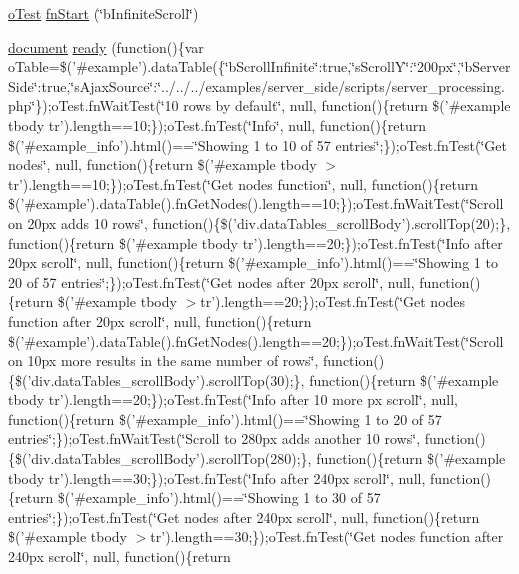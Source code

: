 \begin{DoxyCompactItemize}
\item 
\hyperlink{unit__test_8js_a3b2d259e2df3b6860d9047a92d09d0d6}{o\+Test} \hyperlink{4__server-side_2b_infinite_scroll_8js_afbd556b10fcc8cc11d494a0f87039138}{fn\+Start} (\char`\"{}b\+Infinite\+Scroll\char`\"{})
\item 
\hyperlink{outside_events_8js_aa14f8e0338cced6720590fd2ea13bd4b}{document} \hyperlink{4__server-side_2b_infinite_scroll_8js_a09af2ae78032603f280a6a36406674c7}{ready} (function()\{var o\+Table=\$('\#example').data\+Table(\{\char`\"{}b\+Scroll\+Infinite\char`\"{}\+:true,\char`\"{}s\+Scroll\+Y\char`\"{}\+:\char`\"{}200px\char`\"{},\char`\"{}b\+Server\+Side\char`\"{}\+:true,\char`\"{}s\+Ajax\+Source\char`\"{}\+:\char`\"{}../../../examples/server\+\_\+side/scripts/server\+\_\+processing.\+php\char`\"{}\});o\+Test.\+fn\+Wait\+Test(\char`\"{}10 rows by default\char`\"{}, null, function()\{return \$('\#example tbody tr').\+length==10;\});o\+Test.\+fn\+Test(\char`\"{}\+Info\char`\"{}, null, function()\{return \$('\#example\+\_\+info').\+html()==\char`\"{}\+Showing 1 to 10 of 57 entries\char`\"{};\});o\+Test.\+fn\+Test(\char`\"{}\+Get nodes\char`\"{}, null, function()\{return \$('\#example tbody $>$tr').\+length==10;\});o\+Test.\+fn\+Test(\char`\"{}\+Get nodes function\char`\"{}, null, function()\{return \$('\#example').\+data\+Table().\+fn\+Get\+Nodes().\+length==10;\});o\+Test.\+fn\+Wait\+Test(\char`\"{}\+Scroll on 20px adds 10 rows\char`\"{}, function()\{\$('div.\+data\+Tables\+\_\+scroll\+Body').\+scroll\+Top(20);\}, function()\{return \$('\#example tbody tr').\+length==20;\});o\+Test.\+fn\+Test(\char`\"{}\+Info after 20px scroll\char`\"{}, null, function()\{return \$('\#example\+\_\+info').\+html()==\char`\"{}\+Showing 1 to 20 of 57 entries\char`\"{};\});o\+Test.\+fn\+Test(\char`\"{}\+Get nodes after 20px scroll\char`\"{}, null, function()\{return \$('\#example tbody $>$tr').\+length==20;\});o\+Test.\+fn\+Test(\char`\"{}\+Get nodes function after 20px scroll\char`\"{}, null, function()\{return \$('\#example').\+data\+Table().\+fn\+Get\+Nodes().\+length==20;\});o\+Test.\+fn\+Wait\+Test(\char`\"{}\+Scroll on 10px more results in the same number of rows\char`\"{}, function()\{\$('div.\+data\+Tables\+\_\+scroll\+Body').\+scroll\+Top(30);\}, function()\{return \$('\#example tbody tr').\+length==20;\});o\+Test.\+fn\+Test(\char`\"{}\+Info after 10 more px scroll\char`\"{}, null, function()\{return \$('\#example\+\_\+info').\+html()==\char`\"{}\+Showing 1 to 20 of 57 entries\char`\"{};\});o\+Test.\+fn\+Wait\+Test(\char`\"{}\+Scroll to 280px adds another 10 rows\char`\"{}, function()\{\$('div.\+data\+Tables\+\_\+scroll\+Body').\+scroll\+Top(280);\}, function()\{return \$('\#example tbody tr').\+length==30;\});o\+Test.\+fn\+Test(\char`\"{}\+Info after 240px scroll\char`\"{}, null, function()\{return \$('\#example\+\_\+info').\+html()==\char`\"{}\+Showing 1 to 30 of 57 entries\char`\"{};\});o\+Test.\+fn\+Test(\char`\"{}\+Get nodes after 240px scroll\char`\"{}, null, function()\{return \$('\#example tbody $>$tr').\+length==30;\});o\+Test.\+fn\+Test(\char`\"{}\+Get nodes function after 240px scroll\char`\"{}, null, function()\{return 
\end{DoxyCompactItemize}
